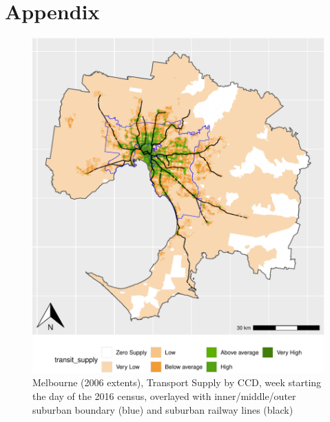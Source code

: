 \documentclass[preprint, 3p,
authoryear]{elsarticle} %
\begin{document}
\hypertarget{appendix}{%
\section{Appendix}\label{appendix}}

\begin{figure}
\centering
\includegraphics{Leveraging_GTFS_to_assess_transit_supply_Transport_Geography_files/figure-latex/Greater_Melbourne_CCD_2016_appendix-1.pdf}
\caption{Melbourne (2006 extents), Transport Supply by CCD, week
starting the day of the 2016 census, overlayed with inner/middle/outer
suburban boundary (blue) and suburban railway lines (black)}
\end{figure}
\end{document}
